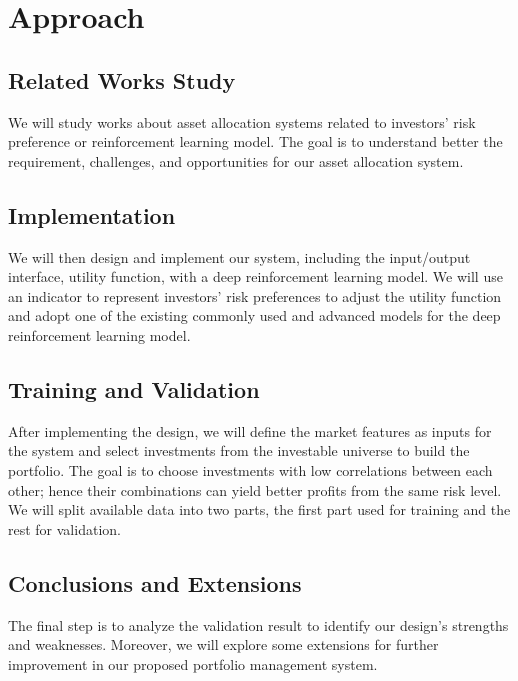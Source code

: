 \chapter{Approach}
\section{Related Works Study}
We will study works about asset allocation systems related to investors' risk preference or reinforcement learning model. The goal is to understand better the requirement, challenges, and opportunities for our asset allocation system.
\section{Implementation}
We will then design and implement our system, including the input/output interface, utility function, with a deep reinforcement learning model. We will use an indicator to represent investors' risk preferences to adjust the utility function and adopt one of the existing commonly used and advanced models for the deep reinforcement learning model.
\section{Training and Validation}
After implementing the design, we will define the market features as inputs for the system and select investments from the investable universe to build the portfolio. The goal is to choose investments with low correlations between each other; hence their combinations can yield better profits from the same risk level. We will split available data into two parts, the first part used for training and the rest for validation. 
\section{Conclusions and Extensions}
The final step is to analyze the validation result to identify our design's strengths and weaknesses. Moreover, we will explore some extensions for further improvement in our proposed portfolio management system.